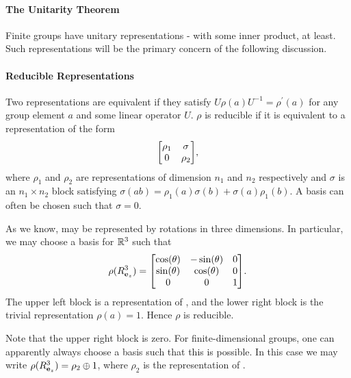\paragraph{The Unitarity Theorem}
Finite groups have unitary representations - with some inner product, at least. Such representations will be the primary concern of the following discussion.

\paragraph{Reducible Representations}
Two representations are equivalent if they satisfy $U\rho(a)U^{-1} = \rho^{\prime}(a)$ for any group element $a$ and some linear operator $U$. $\rho$ is reducible if it is equivalent to a representation of the form
\begin{align*}
	\mqty[
		\rho_{1} & \sigma \\
		0        & \rho_{2}
	],
\end{align*}
where $\rho_{1}$ and $\rho_{2}$ are representations of dimension $n_{1}$ and $n_{2}$ respectively and $\sigma$ is an $n_{1}\times n_{2}$ block satisfying $\sigma(ab) = \rho_{1}(a)\sigma(b) + \sigma(a)\rho_{1}(b)$. A basis can often be chosen such that $\sigma = 0$.

As we know,  may be represented by rotations in three dimensions. In particular, we may choose a basis for $\mathbb{R}^{3}$ such that
\begin{align*}
	\rho(R_{\vb{e}_{z}}^{3}) = 
	\mqty[
		\cos(\theta) & -\sin(\theta) & 0 \\
		\sin(\theta) & \cos(\theta)  & 0 \\
		0            & 0             & 1
	].
\end{align*}
The upper left block is a representation of , and the lower right block is the trivial representation $\rho(a) = 1$. Hence $\rho$ is reducible.

Note that the upper right block is zero. For finite-dimensional groups, one can apparently always choose a basis such that this is possible. In this case we may write $\rho(R_{\vb{e}_{z}}^{3}) = \rho_{2}\oplus 1$, where $\rho_{2}$ is the representation of .

